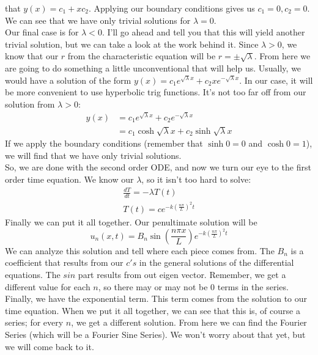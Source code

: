 that $y(x) = c_{1} + xc_{2}$. Applying our boundary conditions gives us
$c_{1} = 0, c_{2} = 0$. We can see that we have only trivial solutions for
$\lambda = 0$.\\
\indent Our final case is for $\lambda < 0$. I'll go ahead and tell you that
this will yield another trivial solution, but we can take a look at the work
behind it. Since $\lambda > 0$, we know that our $r$ from the characteristic
equation will be $r = \pm \sqrt{\lambda}$. From here we are going to do something
 a little unconventional that will help us. Usually, we would have a solution of
the form $y(x) = c_{1}e^{\sqrt{\lambda}x} + c_{2}x e^{-\sqrt{\lambda}x}$. In our
case, it will be more convenient to use hyperbolic trig functions. It's not too
far off from our solution from $\lambda > 0$:
\begin{align*}
y(x) &= c_{1}e^{\sqrt{\lambda}x} + c_{2}e^{-\sqrt{\lambda}x}\\
&= c_{1}\cosh{\sqrt{\lambda}x} + c_{2}\sinh{\sqrt{\lambda}x}
\end{align*}
\noindent If we apply the boundary conditions (remember that
$\sinh{0} = 0$ and $\cosh{0} = 1$), we will find that we have only trivial
solutions.\\
\indent So, we are done with the second order ODE, and now we turn our eye to
the first order time equation. We know our $\lambda$, so it isn't too hard to solve:
\begin{gather*}
\frac{dT}{dt} = -\lambda T(t)\\
T(t) = ce^{-k\left(\frac{n\pi}{L}\right)^{2}t}
\end{gather*}
\indent Finally we can put it all together. Our penultimate solution will be
\[
u_{n}(x,t) = B_{n}\sin{\left(\frac{n\pi x}{L}\right)}e^{-k\left(\frac{n\pi}{L}\right)^{2}t}
\]
\noindent We can analyze this solution and tell where each piece comes from.
The $B_{n}$ is a coefficient that results from our $c's$ in the general solutions
of the differential equations. The $sin$ part results from out eigen vector.
Remember, we get a different value for each $n$, so there may or may not be $0$
terms in the series. Finally, we have the exponential term. This term comes from
the solution to our time equation. When we put it all together, we can see that
this is, of course a series; for every $n$, we get a different solution. From
here we can find the Fourier Series (which will be a Fourier Sine Series). We
won't worry about that yet, but we will come back to it.
\newpage


